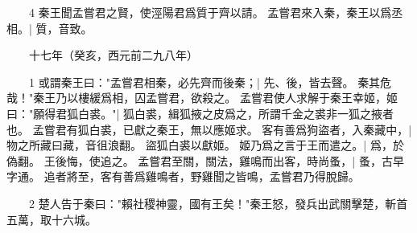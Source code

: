 　　4 秦王聞孟嘗君之賢，使涇陽君爲質于齊以請。
	孟嘗君來入秦，秦王以爲丞相。|{
	質，音致。
}

　　十七年（癸亥，西元前二九八年）

　　1 或謂秦王曰："孟嘗君相秦，必先齊而後秦；|{
	先、後，皆去聲。
}
秦其危哉！"秦王乃以樓緩爲相，囚孟嘗君，欲殺之。
	孟嘗君使人求解于秦王幸姬，姬曰："願得君狐白裘。"|{
	狐白裘，緝狐掖之皮爲之，所謂千金之裘非一狐之掖者也。
}
孟嘗君有狐白裘，已獻之秦王，無以應姬求。
	客有善爲狗盜者，入秦藏中，|{
	物之所藏曰藏，音徂浪翻。
}
盜狐白裘以獻姬。
	姬乃爲之言于王而遣之。|{
	爲，於偽翻。
}
王後悔，使追之。
	孟嘗君至關，關法，雞鳴而出客，時尚蚤，|{
	蚤，古早字通。
}
追者將至，客有善爲雞鳴者，野雞聞之皆鳴，孟嘗君乃得脫歸。


　　2 楚人告于秦曰："賴社稷神靈，國有王矣！"秦王怒，發兵出武關擊楚，斬首五萬，取十六城。


